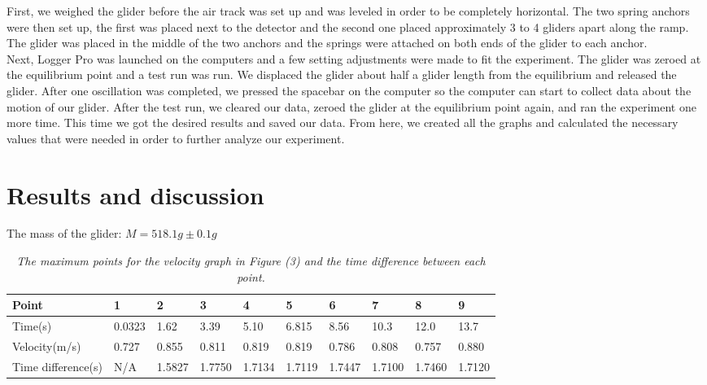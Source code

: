\documentclass{article}
\begin{document}
First, we weighed the glider before the air track was set up and was leveled in order to be completely horizontal. The two spring anchors were then set up, the first was placed next to the detector and the second one placed approximately 3 to 4 gliders apart along the ramp. The glider was placed in the middle of the two anchors and the springs were attached on both ends of the glider to each anchor. \\Next, Logger Pro was launched on the computers and a few setting adjustments were made to fit the experiment. The glider was zeroed at the equilibrium point and a test run was run.  We displaced the glider about half a glider length from the equilibrium and released the glider. After one oscillation was completed, we pressed the spacebar on the computer so the computer can start to collect data about the motion of our glider. After the test run, we cleared our data, zeroed the glider at the equilibrium point again, and ran the experiment one more time. This time we got the desired results and saved our data. From here, we created all the graphs and calculated the necessary values that were needed in order to further analyze our experiment.

\section{Results and discussion}
The mass of the glider: $M = 518.1g\pm0.1g$

\begin{table}
\caption{\label{tab:test}\textit{The maximum points for the velocity graph in Figure (3) and the time difference between each point.}}
\begin{tabular}{@{}llllllllll@{}}
\toprule
Point              & 1      & 2      & 3      & 4      & 5      & 6      & 7      & 8      & 9      \\ \midrule
Time(s)            & 0.0323 & 1.62   & 3.39   & 5.10   & 6.815  & 8.56   & 10.3   & 12.0   & 13.7   \\
Velocity(m/s)      & 0.727  & 0.855  & 0.811  & 0.819  & 0.819  & 0.786  & 0.808  & 0.757  & 0.880  \\
Time difference(s) & N/A    & 1.5827 & 1.7750 & 1.7134 & 1.7119 & 1.7447 & 1.7100 & 1.7460 & 1.7120 \\ \bottomrule
\end{tabular}
\end{table}
\end{document}
